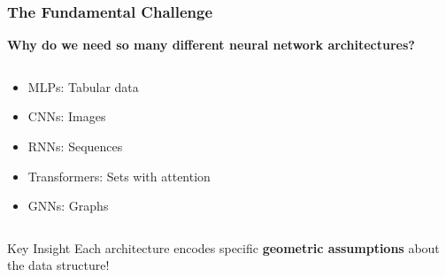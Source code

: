 \begin{frame}[fragile]\frametitle{The Fundamental Challenge}

\begin{center}
\textbf{Why do we need so many different neural network architectures?}
\end{center}

\begin{columns}
\begin{column}{0.5\textwidth}
\begin{itemize}
\item MLPs: Tabular data
\item CNNs: Images 
\item RNNs: Sequences
\item Transformers: Sets with attention
\item GNNs: Graphs
\end{itemize}
\end{column}
\begin{column}{0.5\textwidth}
\end{column}
\end{columns}

\vspace{0.5cm}
\begin{alertblock}{Key Insight}
Each architecture encodes specific \textbf{geometric assumptions} about the data structure!
\end{alertblock}

\end{frame}

